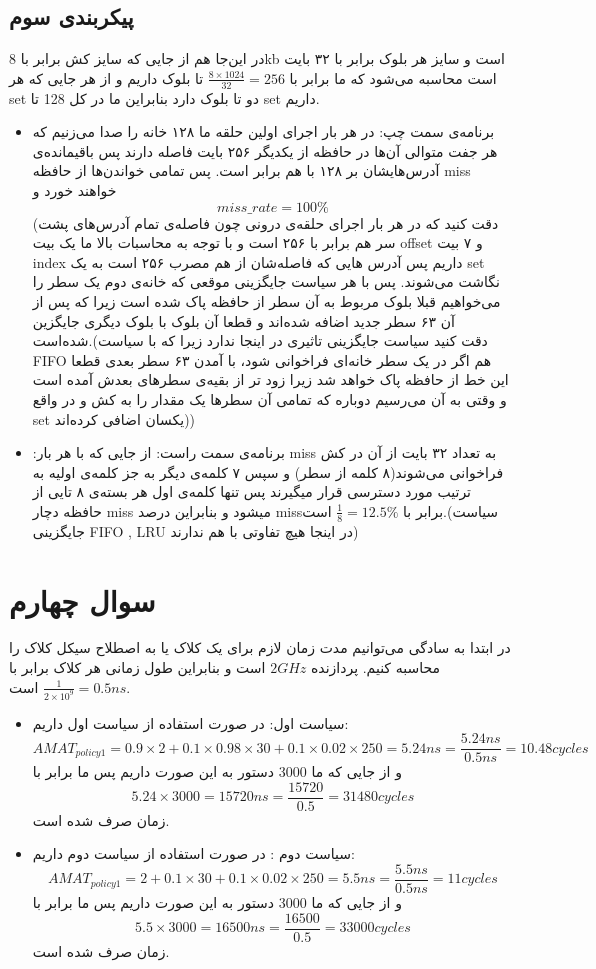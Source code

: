 \documentclass[11pt]{article}
\begin{document}
\subsection{پیکر‌بندی‌ سوم}
در این‌جا هم از جایی که سایز کش برابر با 8kb است  و سایز هر بلوک برابر با ۳۲ بایت است محاسبه می‌شود که ما برابر با
 $\frac{8 \times 1024}{32} = 256$
 تا بلوک داریم و از هر جایی که هر set دو تا بلوک دارد بنابراین ما در کل 128 تا set داریم. 
 \begin{itemize}
\item برنامه‌ی سمت چپ:
در هر بار اجرای اولین حلقه ما ۱۲۸ خانه را صدا می‌زنیم که هر جفت متوالی آن‌ها در حافظه از یکدیگر ۲۵۶ بایت فاصله دارند پس باقیمانده‌ی آدرس‌هایشان بر ۱۲۸ با هم برابر است. پس تمامی خواندن‌ها از حافظه miss خواهند خورد و
$$miss\_rate = 100\%$$
(دقت کنید که در هر بار اجرای حلقه‌ی درونی چون فاصله‌ی تمام آدرس‌های پشت سر هم برابر با ۲۵۶ است و با توجه به محاسبات بالا ما یک بیت offset و ۷ بیت index داریم پس آدرس ‌هایی که فاصله‌شان از هم مصرب ۲۵۶ است به یک set نگاشت می‌شوند. پس با هر سیاست جایگزینی موقعی که خانه‌ی دوم یک سطر را می‌خواهیم قبلا بلوک مربوط به آن سطر از حافظه پاک شده است زیرا که پس از آن ۶۳ سطر جدید اضافه شده‌اند و قطعا آن بلوک با بلوک دیگری جایگزین شده‌است.(دقت کنید سیاست جایگزینی تاثیری در اینجا ندارد زیرا که با سیاست FIFO هم اگر در یک سطر خانه‌ای فراخوانی شود، با آمدن ۶۳ سطر بعدی قطعا این خط از حافظه پاک خواهد شد زیرا زود تر از بقیه‌ی سطر‌های بعدش آمده است و وقتی به آن می‌رسیم دوباره که تمامی آن سطر‌ها یک مقدار را به کش و در واقع set یکسان اضافی کرده‌اند))
\item:برنامه‌ی سمت راست:
از جایی که با هر بار miss به تعداد ۳۲ بایت از آن در کش فراخوانی می‌شوند(۸ کلمه از سطر) و سپس ۷ کلمه‌ی دیگر به جز کلمه‌ی اولیه به ترتیب مورد دسترسی قرار میگیرند پس تنها کلمه‌ی اول هر بسته‌ی ۸ تایی از حافظه دچار miss میشود و بنابراین درصد missبرابر با
 $\frac{1}{8} = 12.5\%$
 است.(سیاست جایگزینی FIFO , LRU در اینجا هیچ تفاوتی با هم ندارند)
\end{itemize} 

\section{سوال چهارم}
در ابتدا به سادگی می‌توانیم مدت زمان لازم برای یک کلاک یا به اصطلاح سیکل کلاک را محاسبه کنیم. پردازنده 
$2GHz$
است و بنابراین طول زمانی هر کلاک برابر با
$\frac{1}{2\times 10^9} = 0.5ns$
است.
\begin{itemize}
\item سیاست اول:
در صورت استفاده از سیاست اول داریم:
$$AMAT_{policy1} = 0.9\times 2 + 0.1\times 0.98 \times 30 + 0.1\times 0.02 \times 250 = 5.24ns = \frac{5.24ns}{0.5ns} = 10.48cycles$$
و از جایی که ما 3000 دستور به این صورت داریم پس ما برابر با 
$$5.24 \times 3000 = 15720ns = \frac{15720}{0.5} = 31480cycles$$
زمان صرف شده است.
\item سیاست دوم :
در صورت استفاده از سیاست دوم داریم:
$$AMAT_{policy1} = 2 + 0.1 \times 30 + 0.1\times 0.02 \times 250 = 5.5ns = \frac{5.5ns}{0.5ns} = 11cycles$$
و از جایی که ما 3000 دستور به این صورت داریم پس ما برابر با 
$$5.5 \times 3000 = 16500ns = \frac{16500}{0.5} = 33000cycles$$
زمان صرف شده است.

\end{itemize}
\end{document}
